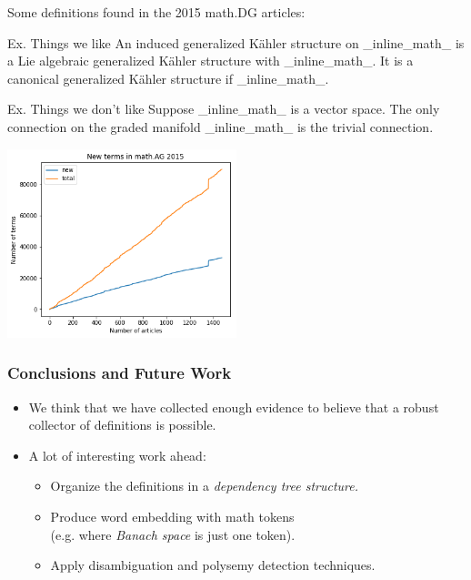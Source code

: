 \documentclass[10pt]{beamer}
\begin{document}
\begin{frame} 
    Some definitions found in the 2015 math.DG articles:
    \begin{block}{Ex. Things we like}
        {\small An {\color{blue}induced generalized Kähler structure} on \_inline\_math\_ is a Lie algebraic generalized Kähler structure with \_inline\_math\_. It is a canonical generalized Kähler structure if \_inline\_math\_.}
    \end{block}
    \begin{exampleblock}{Ex. Things we don't like}
        {\small Suppose \_inline\_math\_ is a {\color{darkgreen}vector space}. The only connection on the {\color{darkgreen}graded manifold} \_inline\_math\_ is the {\color{blue}trivial connection}.}
    \end{exampleblock}
        \begin{center}
    \includegraphics[width=0.5\textwidth]{cum_terms.png} 
        \end{center}
\end{frame}
\begin{frame} 
    \frametitle{Conclusions and Future Work}
    \begin{itemize}
            \item We think that we have collected enough evidence to believe that a robust collector of definitions is possible.
            \item A lot of interesting work ahead:
                \begin{itemize}
                    \item Organize the definitions in a \emph{dependency tree structure.}
                    \item Produce word embedding with math tokens\\
                        (e.g. where \emph{Banach space} is just one token).
                \item Apply disambiguation and polysemy detection techniques.
                \end{itemize}
    \end{itemize}
\end{frame}

\begin{frame}
\titlepage
\end{frame}
\end{document}
